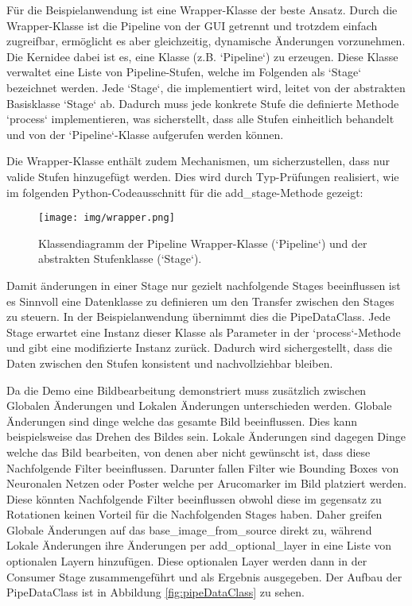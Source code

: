 \documentclass[a4paper]{article} %
\begin{document}
Für die Beispielanwendung ist eine Wrapper-Klasse der beste Ansatz. Durch die Wrapper-Klasse ist die Pipeline von der GUI getrennt und trotzdem einfach zugreifbar, ermöglicht es aber gleichzeitig, dynamische Änderungen vorzunehmen. Die Kernidee dabei ist es, eine Klasse (z.B. `Pipeline`) zu erzeugen. Diese Klasse verwaltet eine Liste von Pipeline-Stufen, welche im Folgenden als `Stage` bezeichnet werden. Jede `Stage`, die implementiert wird, leitet von der abstrakten Basisklasse `Stage` ab. Dadurch muss jede konkrete Stufe die definierte Methode `process` implementieren, was sicherstellt, dass alle Stufen einheitlich behandelt und von der `Pipeline`-Klasse aufgerufen werden können.

Die Wrapper-Klasse enthält zudem Mechanismen, um sicherzustellen, dass nur valide Stufen hinzugefügt werden. Dies wird durch Typ-Prüfungen realisiert, wie im folgenden Python-Codeausschnitt für die add\_stage-Methode gezeigt:

\begin{figure}[htbp]
    \centering
    \texttt{[image: img/wrapper.png]}
    \caption{Klassendiagramm der Pipeline Wrapper-Klasse (`Pipeline`) und der abstrakten Stufenklasse (`Stage`).}
    \label{fig:wrapper}
\end{figure}

Damit änderungen in einer Stage nur gezielt nachfolgende Stages beeinflussen ist es Sinnvoll eine Datenklasse zu definieren um den Transfer zwischen den Stages zu steuern. In der Beispielanwendung übernimmt dies die PipeDataClass. Jede Stage erwartet eine Instanz dieser Klasse als Parameter in der `process`-Methode und gibt eine modifizierte Instanz zurück. Dadurch wird sichergestellt, dass die Daten zwischen den Stufen konsistent und nachvollziehbar bleiben.

Da die Demo eine Bildbearbeitung demonstriert muss zusätzlich zwischen Globalen Änderungen und Lokalen Änderungen unterschieden werden. Globale Änderungen sind dinge welche das gesamte Bild beeinflussen. Dies kann beispielsweise das Drehen des Bildes sein. Lokale Änderungen sind dagegen Dinge welche das Bild bearbeiten, von denen aber nicht gewünscht ist, dass diese Nachfolgende Filter beeinflussen. Darunter fallen Filter wie Bounding Boxes von Neuronalen Netzen oder Poster welche per Arucomarker im Bild platziert werden. 
Diese könnten Nachfolgende Filter beeinflussen obwohl diese im gegensatz zu Rotationen keinen Vorteil für die Nachfolgenden Stages haben. Daher greifen Globale Änderungen auf das base\_image\_from\_source direkt zu, während Lokale Änderungen ihre Änderungen per 
add\_optional\_layer in eine Liste von optionalen Layern hinzufügen. Diese optionalen Layer werden dann in der Consumer Stage zusammengeführt und als Ergebnis ausgegeben. Der Aufbau der PipeDataClass ist in Abbildung \ref{fig:pipeDataClass} zu sehen.
\end{document}
